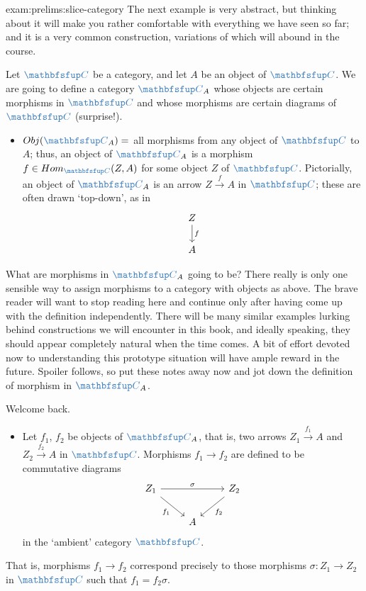 \begin{exam}{}{exam:prelims:slice-category}
  The next example is very abstract, but thinking about it will make
  you rather comfortable with everything we have seen so far; and it
  is a very common construction, variations of which will abound in
  the course.

  Let $\categ{C}$ be a category, and let $A$ be an object of
  $\categ{C}$. We are going to define a category $\categ{C}_A$ whose
  objects are certain morphisms in $\categ{C}$ and whose morphisms are
  certain diagrams of $\categ{C}$ (surprise!).
  \begin{itemize}
  \item $\Obj(\categ{C}_A) = $ all morphisms from any object of
    $\categ{C}$ to $A$; thus, an object of $\categ{C}_A$ is a morphism
    $f \in \Hom_{\categ{C}}(Z, A)$ for some object $Z$ of $\categ{C}$.
    Pictorially, an object of $\categ{C}_A$ is an arrow
    $Z \xrightarrow{f} A$ in $\categ{C}$; these are often drawn
    `top-down', as in
    \[
      \begin{tikzcd} Z \arrow[d, "f"] \\ A \end{tikzcd}
    \]
  \end{itemize}
  What are morphisms in $\categ{C}_A$ going to be? There really is
  only one sensible way to assign morphisms to a category with objects
  as above. The brave reader will want to stop reading here and
  continue only after having come up with the definition
  independently. There will be many similar examples lurking behind
  constructions we will encounter in this book, and ideally speaking,
  they should appear completely natural when the time comes. A bit of
  effort devoted now to understanding this prototype situation will
  have ample reward in the future. Spoiler follows, so put these notes
  away now and jot down the definition of morphism in $\categ{C}_A$.

  Welcome back.
  \begin{itemize}
  \item Let $f_1$, $f_2$ be objects of $\categ{C}_A$, that is, two
    arrows $Z_1 \xrightarrow{f_1} A$ and $Z_2 \xrightarrow{f_2} A$ in
    $\categ{C}$.  Morphisms $f_1 \to f_2$ are defined to be
    commutative diagrams
    \[
      \begin{tikzcd}
        Z_1 \arrow[rr, "\sigma"] \arrow[dr, "f_1"'] & & Z_2 \arrow[dl, "f_2"] \\
        & A &
      \end{tikzcd}
    \]
    in the `ambient' category $\categ{C}$.
  \end{itemize}
  That is, morphisms $f_1 \to f_2$ correspond precisely to those
  morphisms $\sigma : Z_1 \to Z_2$ in $\categ{C}$ such that
  $f_1 = f_2 \sigma$.


\end{exam}
